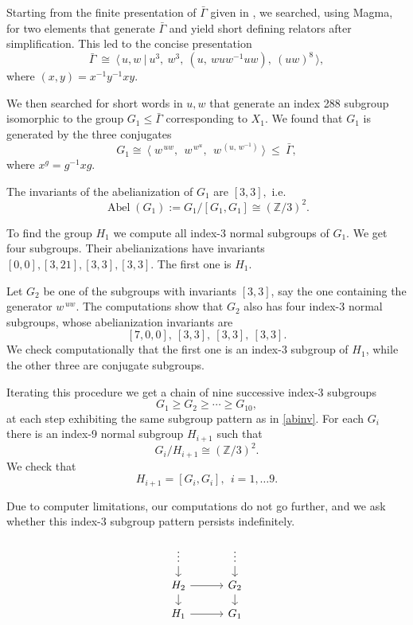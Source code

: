 \documentclass[10pt,a4paper]{article}
\DeclareMathOperator{\Abel}{Abel}
\newcommand{\ZZ}{\mathbb{Z}}
\begin{document}
Starting from the finite presentation of \(\bar\Gamma\) given in \cite{CKYshort},
we searched, using Magma, for two elements that generate \(\bar\Gamma\) and yield short defining
relators after simplification. This led to the concise presentation
\[
\bar\Gamma \ \cong\ 
\Big\langle\, u,w \ \Big|\ u^3,\ w^3,\ (u,\ w u w^{-1} u w),\ (uw)^8 \,\Big\rangle,
\]
where \((x,y)=x^{-1}y^{-1}xy\).

We then searched for short words in \(u,w\)
that generate an index 288 subgroup isomorphic to the group \(G_1\le\bar\Gamma\) corresponding to \(X_1\).
We found that \(G_1\) is generated by the three conjugates
\[
G_1 \cong\ \big\langle\; w^{\,u w},\ \ w^{\,w^u},\ \ w^{\,(u,\,w^{-1})}\ \big\rangle
\ \le\ \bar\Gamma,
\]
where \(x^g=g^{-1}xg\).

The invariants of the abelianization of $G_1$ are $[3,3],$
i.e. $$\Abel(G_1):=G_1/[G_1,G_1]\cong (\ZZ/3)^2.$$

To find the group $H_1$ we compute all index-3 normal subgroups of $G_1.$
We get four subgroups. Their abelianizations have invariants $[0,0], [3,21], [3,3], [3,3]$.
The first one is $H_1.$

Let $G_2$ be one of the subgroups with invariants $[3,3]$, say the one containing the generator $w^{\,u w}.$
The computations show that $G_2$ also has four index-3 normal subgroups, whose abelianization invariants are
\begin{equation}\label{abinv}
[7,0,0],\ [3,3],\ [3,3],\ [3,3].
\end{equation}
We check computationally that the first one is an index-3 subgroup of $H_1$,
while the other three are conjugate subgroups.

Iterating this procedure we get a chain of nine successive index-3 subgroups
$$G_1\geq G_2\geq\cdots \geq G_{10},$$
at each step exhibiting the same subgroup pattern as in \eqref{abinv}.
For each $G_i$ there is an index-9 normal subgroup $H_{i+1}$ such that
$$G_i/H_{i+1}\cong(\ZZ/3)^2.$$
We check that $$H_{i+1}=[G_i,G_i],\ \ i=1,\ldots 9.$$

Due to computer limitations, our computations do not go further,
and we ask whether this index-3 subgroup pattern persists indefinitely.

\[
\begin{tikzcd}[row sep=1.0em, column sep=3em]
\vdots \arrow[r, phantom] \arrow[d] & \vdots \arrow[d] \\
H_{2}  \arrow[r] \arrow[d] & G_{2}  \arrow[d] \\
H_{1}  \arrow[r]            & G_{1}
\end{tikzcd}
\]
\end{document}

